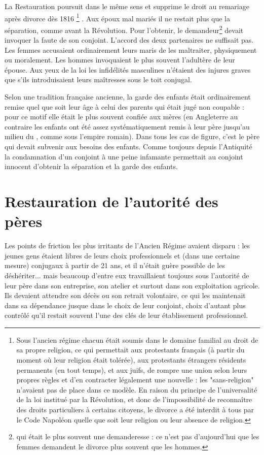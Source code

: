  La Restauration poursuit dans le même sens et supprime le droit au remariage après divorce dès 1816
\footnote{Sous l'ancien régime chacun était soumis dans le domaine familial au droit de sa propre religion, ce qui permettait aux protestants français (à partir du moment où leur religion était tolérée), aux protestants étrangers résidents permanents (en tout temps), et aux juifs, de rompre une union selon leurs propres règles et d'en contracter légalement une nouvelle : les "sans-religion" n'avaient pas de place dans ce modèle. En raison du principe de l'universalité de la loi institué par la Révolution, et donc de l'impossibilité de reconnaître des droits particuliers à certains citoyens, le divorce a été interdit à tous par le Code Napoléon quelle que soit leur religion ou leur absence de religion. }
. Aux époux mal mariés il ne restait plus que la séparation, comme avant la Révolution. Pour l'obtenir, le demandeur\footnote{qui était le plus souvent une demanderesse : ce n'est pas d'aujourd'hui que les femmes demandent le divorce plus souvent que les hommes.} devait invoquer la faute de son conjoint. L'accord des deux partenaires ne suffisait pas. Les femmes accusaient ordinairement leurs maris de les maltraiter, physiquement ou moralement. Les hommes invoquaient le plus souvent l'adultère de leur épouse. Aux yeux de la loi les infidélités masculines n'étaient des injures graves que s'ils introduisaient leurs maîtresses sous le toit conjugal. 

 Selon une tradition française ancienne, la garde des enfants était ordinairement remise quel que soit leur âge à celui des parents qui était jugé non coupable : pour ce motif elle était le plus souvent confiée aux mères (en Angleterre au contraire les enfants ont été assez systématiquement remis à leur père jusqu'au milieu du , comme sous l'empire romain). Dans tous les cas de figure, c'est le père qui devait subvenir aux besoins des enfants. Comme toujours depuis l'Antiquité la condamnation d'un conjoint à une peine infamante permettait au conjoint innocent d'obtenir la séparation et la garde des enfants.

\section{Restauration de l'autorité des pères}

 Les points de friction les plus irritants de l'Ancien Régime avaient disparu : les jeunes gens étaient libres de leurs choix professionnels et (dans une certaine mesure) conjugaux à partir de 21 ans, et il n'était guère possible de les déshériter... mais beaucoup d'entre eux travaillaient toujours sous l'autorité de leur père dans son entreprise, son atelier et surtout dans son exploitation agricole. Ils devaient attendre son décès ou son retrait volontaire, ce qui les maintenait dans sa dépendance jusque dans le choix de leur conjoint, choix d'autant plus contrôlé qu'il restait souvent l'une des clés de leur établissement professionnel. 

